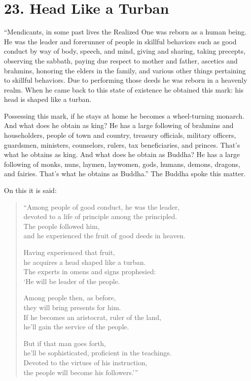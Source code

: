 \documentclass[12pt,openany]{book}%
\begin{document}
\section*{23. Head Like a Turban }

“Mendicants, in some past lives the Realized One was reborn as a human being. He was the leader and forerunner of people in skillful behaviors such as good conduct by way of body, speech, and mind, giving and sharing, taking precepts, observing the sabbath, paying due respect to mother and father, ascetics and brahmins, honoring the elders in the family, and various other things pertaining to skillful behaviors. Due to performing those deeds he was reborn in a heavenly realm. When he came back to this state of existence he obtained this mark: his head is shaped like a turban. 

Possessing this mark, if he stays at home he becomes a wheel-turning monarch. And what does he obtain as king? He has a large following of brahmins and householders, people of town and country, treasury officials, military officers, guardsmen, ministers, counselors, rulers, tax beneficiaries, and princes. That’s what he obtains as king. And what does he obtain as Buddha? He has a large following of monks, nuns, laymen, laywomen, gods, humans, demons, dragons, and fairies. That’s what he obtains as Buddha.” The Buddha spoke this matter. 

On this it is said: 

\begin{verse}%
“Among people of good conduct, he was the leader, \\
devoted to a life of principle among the principled. \\
The people followed him, \\
and he experienced the fruit of good deeds in heaven. 

Having experienced that fruit, \\
he acquires a head shaped like a turban. \\
The experts in omens and signs prophesied: \\
‘He will be leader of the people. 

Among people then, as before, \\
they will bring presents for him. \\
If he becomes an aristocrat, ruler of the land, \\
he’ll gain the service of the people. 

But if that man goes forth, \\
he’ll be sophisticated, proficient in the teachings. \\
Devoted to the virtues of his instruction, \\
the people will become his followers.’” 

%
\end{verse}
\end{document}
